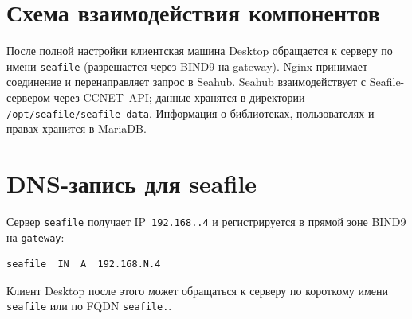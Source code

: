 \section{Схема взаимодействия компонентов}

После полной настройки клиентская машина Desktop обращается к серверу по имени
\texttt{seafile} (разрешается через BIND9 на gateway). Nginx принимает соединение
и перенаправляет запрос в Seahub. Seahub взаимодействует с Seafile-сервером
через CCNET~API; данные хранятся в директории \texttt{/opt/seafile/seafile-data}.
Информация о библиотеках, пользователях и правах хранится в MariaDB.

\section{DNS-запись для seafile}

Сервер \texttt{seafile} получает IP~\texttt{192.168.\cfgLabStudentN.4} и
регистрируется в прямой зоне BIND9 на \texttt{gateway}:
\begin{lstlisting}
seafile  IN  A  192.168.N.4
\end{lstlisting}
Клиент Desktop после этого может обращаться к серверу по короткому имени
\texttt{seafile} или по FQDN \texttt{seafile.\cfgDomain}.

\endinput
